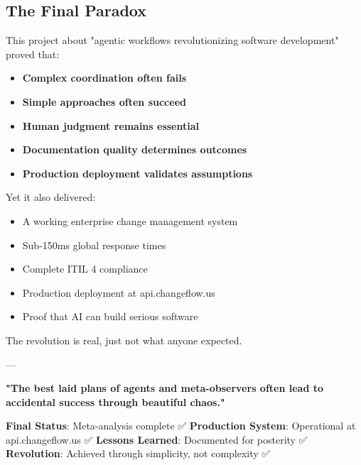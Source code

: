 \documentclass[11pt]{article}
\begin{document}
\subsection{The Final Paradox}
\label{sec:org00b992b}
This project about "agentic workflows revolutionizing software development" proved that:
\begin{itemize}
\item \textbf{\textbf{Complex coordination often fails}}
\item \textbf{\textbf{Simple approaches often succeed}}
\item \textbf{\textbf{Human judgment remains essential}}
\item \textbf{\textbf{Documentation quality determines outcomes}}
\item \textbf{\textbf{Production deployment validates assumptions}}
\end{itemize}

Yet it also delivered:
\begin{itemize}
\item A working enterprise change management system
\item Sub-150ms global response times
\item Complete ITIL 4 compliance
\item Production deployment at api.changeflow.us
\item Proof that AI can build serious software
\end{itemize}

The revolution is real, just not what anyone expected.

---

\textbf{"The best laid plans of agents and meta-observers often lead to accidental success through beautiful chaos."}

\textbf{\textbf{Final Status}}: Meta-analysis complete ✅  
\textbf{\textbf{Production System}}: Operational at api.changeflow.us ✅  
\textbf{\textbf{Lessons Learned}}: Documented for posterity ✅  
\textbf{\textbf{Revolution}}: Achieved through simplicity, not complexity ✅
\end{document}
